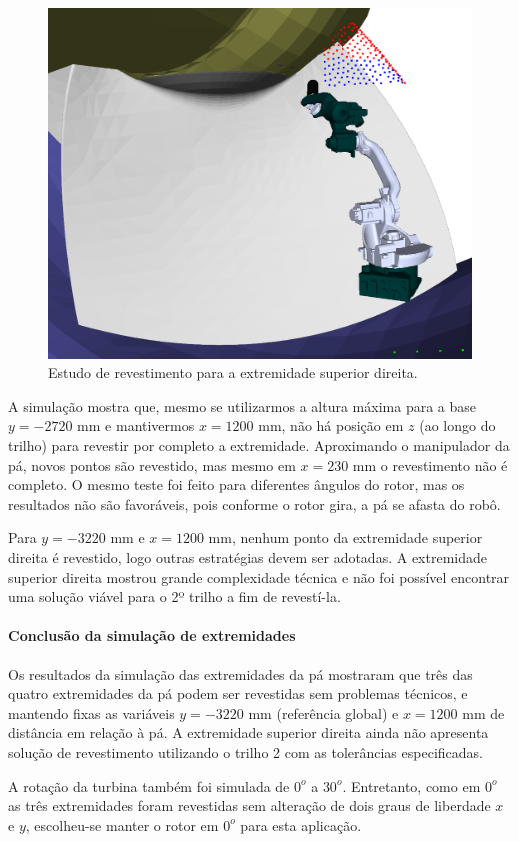 \begin{figure}[!ht]
	\centering	
	\includegraphics[width=.5\columnwidth]{method/figs/shoulderright.png}
	\caption{Estudo de revestimento para a extremidade superior direita.}
	\label{fig::shoulderright}
\end{figure}

A simulação mostra que, mesmo se utilizarmos a altura máxima para a base
$y=-2720$ mm e mantivermos $x=1200$ mm, não há posição em $z$ (ao longo do
trilho) para revestir por completo a extremidade. Aproximando o manipulador da
pá, novos pontos são revestido, mas mesmo em $x=230$ mm o
revestimento não é completo. O mesmo teste foi feito para diferentes
ângulos do rotor, mas os resultados não são favoráveis, pois conforme o rotor
gira, a pá se afasta do robô.

Para $y=-3220$ mm e $x=1200$ mm, nenhum ponto da extremidade superior direita é
revestido, logo outras estratégias devem ser adotadas. A extremidade superior
direita mostrou grande complexidade técnica e não foi possível encontrar uma
solução viável para o 2º trilho a fim de revestí-la.

\paragraph{Conclusão da simulação de extremidades}

Os resultados da simulação das extremidades da pá mostraram que três das
quatro extremidades da pá podem ser revestidas sem problemas técnicos, e
mantendo fixas as variáveis $y=-3220$ mm (referência global) e $x=1200$ mm de
distância em relação à pá. A extremidade superior direita ainda não apresenta
solução de revestimento utilizando o trilho 2 com as tolerâncias especificadas.

A rotação da turbina também foi simulada de $0^o$ a $30^o$. Entretanto, como
em $0^o$ as três extremidades foram revestidas sem alteração de dois graus de
liberdade $x$ e $y$, escolheu-se manter o rotor em $0^o$ para esta aplicação.

